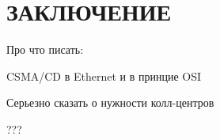 \section*{\centering ЗАКЛЮЧЕНИЕ}

Про что писать:

CSMA/CD в Ethernet и в принцие OSI

Серьезно сказать о нужности колл-центров

???
 \clearpage